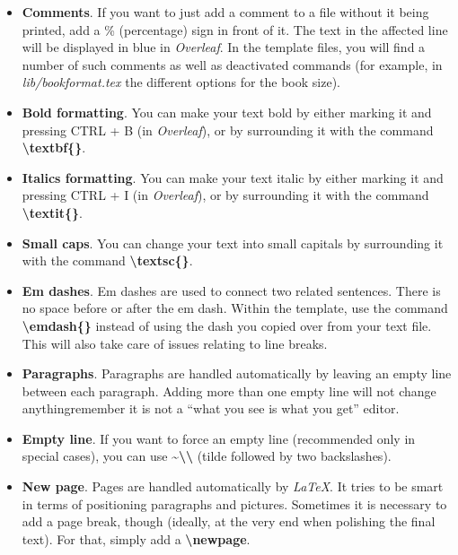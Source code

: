\begin{itemize}

    \item \textbf{Comments}. If you want to just add a comment to a file without it being printed, add a \% (percentage) sign in front of it. The text in the affected line will be displayed in blue in \textit{Overleaf}. In the template files, you will find a number of such comments as well as deactivated commands (for example, in \textit{lib/bookformat.tex} the different options for the book size).
    
    \item \textbf{Bold formatting}. You can make your text bold by either marking it and pressing CTRL + B (in \textit{Overleaf}), or by surrounding it with the command \textbf{\textbackslash textbf\{\}}.
    
    \item \textbf{Italics formatting}. You can make your text italic by either marking it and pressing CTRL + I (in \textit{Overleaf}), or by surrounding it with the command \textbf{\textbackslash textit\{\}}.
    
    \item \textbf{Small caps}. You can change your text into small capitals by surrounding it with the command \textbf{\textbackslash textsc\{\}}.
    
    \item \textbf{Em dashes}. Em dashes are used to connect two related sentences. There is no space before or after the em dash. Within the template, use the command \textbf{\textbackslash emdash\{\}} instead of using the dash you copied over from your text file. This will also take care of issues relating to line breaks.
    
    \item \textbf{Paragraphs}. Paragraphs are handled automatically by leaving an empty line between each paragraph. Adding more than one empty line will not change anything\emdash{}remember it is not a ``what you see is what you get'' editor.
    
    \item \textbf{Empty line}. If you want to force an empty line (recommended only in special cases), you can use \textbf{\~{}\textbackslash\textbackslash} (tilde followed by two backslashes).
    
    \item \textbf{New page}. Pages are handled automatically by \textit{LaTeX}. It tries to be smart in terms of positioning paragraphs and pictures. Sometimes it is necessary to add a page break, though (ideally, at the very end when polishing the final text). For that, simply add a \textbf{\textbackslash newpage}.
    

\end{itemize}
